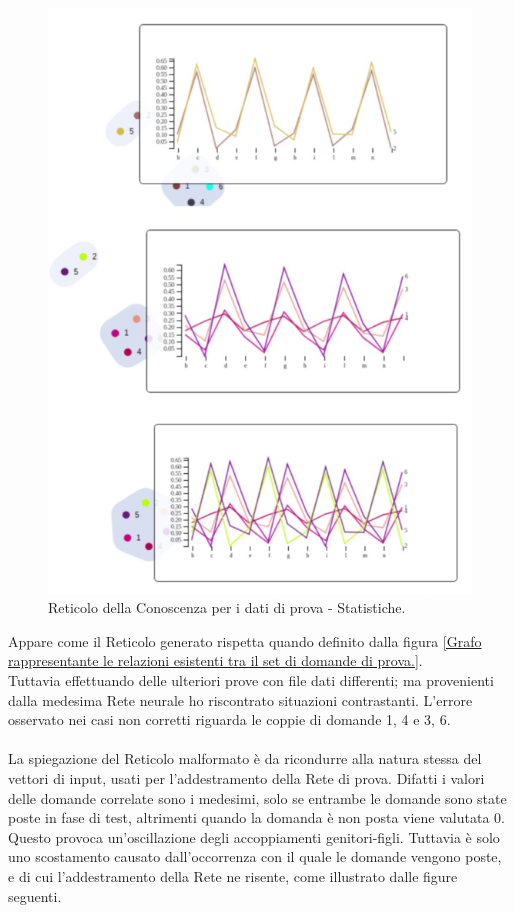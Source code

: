 \begin{figure}[H]
\centering
	\includegraphics[width=0.50\linewidth]{./image/collage_reticolo-general-statistic.png}
	\caption{Reticolo della Conoscenza per i dati di prova - Statistiche.}
	\label{Reticolo della Conoscenza per i dati di prova - Statistiche.}
\end{figure}
\noindent
Appare come il Reticolo generato rispetta quando definito dalla figura \ref{Grafo rappresentante le relazioni esistenti tra il set di domande di prova.}.\\
Tuttavia effettuando delle ulteriori prove con file dati differenti; ma provenienti dalla medesima Rete neurale ho riscontrato situazioni contrastanti. L'errore osservato nei casi non corretti riguarda le coppie di domande 1, 4 e 3, 6.\\\\
La spiegazione del Reticolo malformato \`e da ricondurre alla natura stessa del vettori di input, usati per l'addestramento della Rete di prova. Difatti i valori delle domande correlate sono i medesimi, solo se entrambe le domande sono state poste in fase di test, altrimenti quando la domanda \`e non posta viene valutata 0. Questo provoca un'oscillazione degli accoppiamenti genitori-figli. Tuttavia \`e solo uno scostamento causato dall'occorrenza  con il quale le domande vengono poste, e di cui l'addestramento della Rete ne risente, come illustrato dalle figure seguenti.
